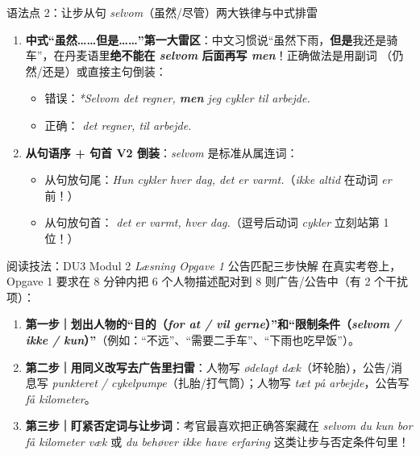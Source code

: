 \begin{grammatikbox}{语法点 2：让步从句 \textit{selvom}（虽然/尽管）两大铁律与中式排雷}
\begin{enumerate}
  \item \textbf{中式“虽然……但是……”第一大雷区}：中文习惯说“虽然下雨，\textbf{但是}我还是骑车”，在丹麦语里\textbf{绝不能在 \textit{selvom} 后面再写 \textit{men}}！正确做法是用副词 （仍然/还是）或直接主句倒装：
    \begin{itemize}
      \item 错误：\textit{*Selvom det regner, \textbf{men} jeg cykler til arbejde.}
      \item 正确：\textit{ det regner,  til arbejde.}
    \end{itemize}
  \item \textbf{从句语序 + 句首 V2 倒装}：\textit{selvom} 是标准从属连词：
    \begin{itemize}
      \item 从句放句尾：\textit{Hun cykler hver dag,  det  er varmt.}（\textit{ikke altid} 在动词 \textit{er} 前！）
      \item 从句放句首：\textit{ det  er varmt,  hver dag.}（逗号后动词 \textit{cykler} 立刻站第 1 位！）
    \end{itemize}
\end{enumerate}
\end{grammatikbox}

\begin{grammatikbox}{阅读技法：DU3 Modul 2 \textit{Læsning Opgave 1} 公告匹配三步快解}
在真实考卷上，Opgave 1 要求在 8 分钟内把 6 个人物描述配对到 8 则广告/公告中（有 2 个干扰项）：
\begin{enumerate}
  \item \textbf{第一步｜划出人物的“目的（\textit{for at / vil gerne}）”和“限制条件（\textit{selvom / ikke / kun}）”}（例如：“不远”、“需要二手车”、“下雨也吃早饭”）。
  \item \textbf{第二步｜用同义改写去广告里扫雷}：人物写 \textit{ødelagt dæk}（坏轮胎），公告/消息写 \textit{punkteret / cykelpumpe}（扎胎/打气筒）；人物写 \textit{tæt på arbejde}，公告写 \textit{få kilometer}。
  \item \textbf{第三步｜盯紧否定词与让步词}：考官最喜欢把正确答案藏在 \textit{selvom du kun bor få kilometer væk} 或 \textit{du behøver ikke have erfaring} 这类让步与否定条件句里！
\end{enumerate}
\end{grammatikbox}

